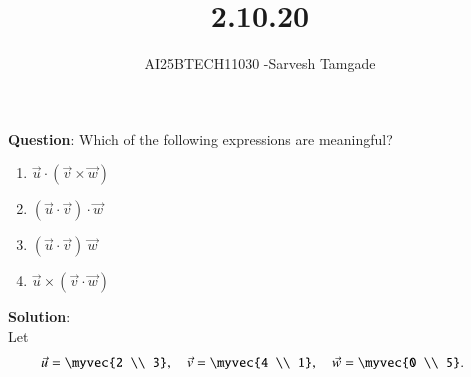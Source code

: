 \documentclass[journal]{IEEEtran}
\begin{document}

\vspace{3cm}

\title{2.10.20}
\author{AI25BTECH11030 -Sarvesh Tamgade}
{\let\newpage\relax\maketitle}

\renewcommand{\thefigure}{\theenumi}
\renewcommand{\thetable}{\theenumi}
\setlength{\intextsep}{10pt} 


\renewcommand{\thetable}{\theenumi}


\textbf{Question}:  Which of the following expressions are meaningful?
\begin{multicols}{2}
\begin{enumerate}[label=(\alph*)]
     
\item $\vec{u} \cdot (\vec{v} \times \vec{w})$
\item $(\vec{u} \cdot \vec{v}) \cdot \vec{w}$
\item $(\vec{u} \cdot \vec{v})\ \vec{w}$
\item $\vec{u} \times (\vec{v} \cdot \vec{w})$

\end{enumerate}
\end{multicols}

\textbf{Solution}:\\
Let
\begin{align}
    \vec{u} &= \myvec{2 \\ 3}, \quad
    \vec{v} = \myvec{4 \\ 1}, \quad
    \vec{w} = \myvec{0 \\ 5}.
\end{align}
\end{document}
